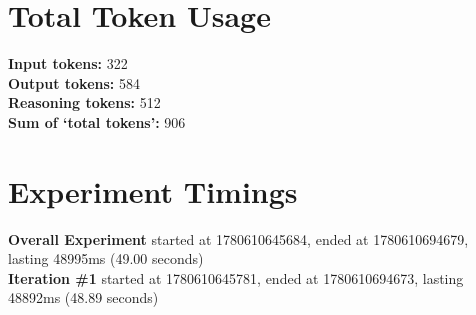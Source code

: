 \documentclass{article}
\begin{document}
\section*{Total Token Usage}
\textbf{Input tokens: }322
\\\textbf{Output tokens: }584
\\\textbf{Reasoning tokens: }512
\\\textbf{Sum of `total tokens': }906
\section*{Experiment Timings}
\textbf{Overall Experiment} started at 1780610645684, ended at 1780610694679, lasting 48995ms (49.00 seconds)
\\\textbf{Iteration \#1} started at 1780610645781, ended at 1780610694673, lasting 48892ms (48.89 seconds)
\end{document}
